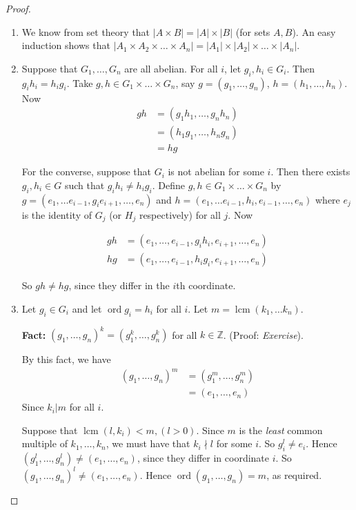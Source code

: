 \documentclass{article}
\theoremstyle{definition}
\newcommand{\integers}{\mathbb{Z}}
\DeclareMathOperator{\lcm}{lcm}
\DeclareMathOperator{\ord}{\text{ord}}
\begin{document}
\begin{proof}\hfill
  \begin{enumerate}
    \item We know from set theory that $|A \times B| = |A| \times |B|$ (for sets $A,B$). An easy induction shows that $|A_1 \times A_2 \times \dots \times A_n| = |A_1| \times |A_2| \times \dots \times |A_n|$.
    \item Suppose that $G_1, \dots , G_n$ are all abelian. For all $i$, let $g_i,h_i\in G_i$. Then $g_ih_i=h_ig_i$. Take $g,h \in G_1 \times \dots \times G_n$, say $g=\left( g_1, \dots , g_n \right)$, $h = \left( h_1, \dots , h_n \right)$. Now
\begin{align*}
  gh &= \left( g_1 h_1, \dots , g_n h_n \right)\\
  &= \left( h_1g_1, \dots , h_n g_n \right)\\
  &= hg
\end{align*}

For the converse, suppose that $G_i$ is not abelian for some $i$. Then there exists $g_i,h_i \in G$ such that $g_ih_i \neq h_ig_i$. Define $g,h \in G_1 \times \dots \times G_n$ by $g = \left( e_1,\dots e_{i-1},g_ie_{i+1},\dots,e_n \right)$ and $h = \left( e_1, \dots e_{i-1},h_i,e_{i-1},\dots,e_n \right)$ where $e_j$ is the identity of $G_j$ (or $H_j$ respectively) for all $j$. Now

\begin{align*}
  gh &= \left( e_1,\dots,e_{i-1},g_ih_i,e_{i+1},\dots,e_n \right)\\
  hg &= \left( e_1,\dots,e_{i-1},h_ig_i,e_{i+1},\dots,e_n \right)
\end{align*}

So $gh \neq hg$, since they differ in the $i$th coordinate.

\item Let $g_i \in G_i$ and let $\ord g_i=h_i$ for all $i$. Let $m=\lcm(k_1,\dots k_n)$.

  \textbf{Fact:} $(g_1, \dots ,g_n)^{k}=(g_1^k,\dots,g_n^k)$ for all $k \in \integers$. (Proof: \emph{Exercise}).

  By this fact, we have 
  \begin{align*}
    \left( g_1, \dots, g_n \right)^m &= \left( g_1^m, \dots,g_n^m \right)\\
    &= \left( e_1, \dots,e_n \right)
  \end{align*}
  Since $k_i | m$ for all $i$.

  Suppose that $\lcm(l,k_i)<m,(l>0)$. Since $m$ is the \emph{least} common multiple of $k_1, \dots, k_n$, we must have that $k_i\nmid l$ for some $i$. So $g_i^l\neq e_i$. Hence $\left( g_1^l,\dots,g_n^l \right) \neq \left( e_1,\dots,e_n \right)$, since they differ in coordinate $i$. So $\left( g_1 ,\dots,g_n \right)^l \neq \left( e_1, \dots,e_n \right)$. Hence $\ord \left( g_1 ,\dots,g_n \right)=m$, as required.
  \end{enumerate}
\end{proof}
\end{document}
